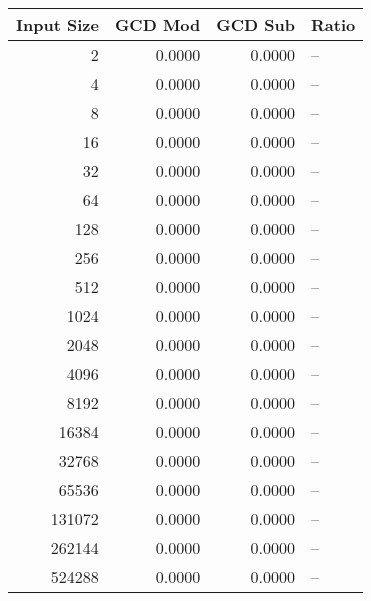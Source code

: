 \begin{tabular}{rrrl}
\toprule
Input Size & GCD Mod & GCD Sub & Ratio \\
\midrule
2 & 0.0000 & 0.0000 & -- \\
4 & 0.0000 & 0.0000 & -- \\
8 & 0.0000 & 0.0000 & -- \\
16 & 0.0000 & 0.0000 & -- \\
32 & 0.0000 & 0.0000 & -- \\
64 & 0.0000 & 0.0000 & -- \\
128 & 0.0000 & 0.0000 & -- \\
256 & 0.0000 & 0.0000 & -- \\
512 & 0.0000 & 0.0000 & -- \\
1024 & 0.0000 & 0.0000 & -- \\
2048 & 0.0000 & 0.0000 & -- \\
4096 & 0.0000 & 0.0000 & -- \\
8192 & 0.0000 & 0.0000 & -- \\
16384 & 0.0000 & 0.0000 & -- \\
32768 & 0.0000 & 0.0000 & -- \\
65536 & 0.0000 & 0.0000 & -- \\
131072 & 0.0000 & 0.0000 & -- \\
262144 & 0.0000 & 0.0000 & -- \\
524288 & 0.0000 & 0.0000 & -- \\
\bottomrule
\end{tabular}
